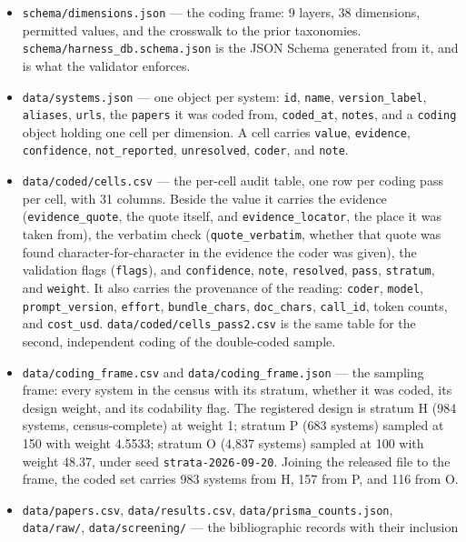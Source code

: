 \begin{itemize}
\item \texttt{schema/dimensions.json} --- the coding frame: 9 layers, 38 dimensions,
  permitted values, and the crosswalk to the prior taxonomies. \texttt{schema/harness\_db.schema.json}
  is the JSON Schema generated from it, and is what the validator enforces.
\item \texttt{data/systems.json} --- one object per system: \texttt{id}, \texttt{name},
  \texttt{version\_label}, \texttt{aliases}, \texttt{urls}, the \texttt{papers} it was coded from,
  \texttt{coded\_at}, \texttt{notes}, and a \texttt{coding} object holding one cell per dimension.
  A cell carries \texttt{value}, \texttt{evidence}, \texttt{confidence}, \texttt{not\_reported},
  \texttt{unresolved}, \texttt{coder}, and \texttt{note}.
\item \texttt{data/coded/cells.csv} --- the per-cell audit table, one row per coding pass per cell,
  with 31 columns. Beside the value it carries the evidence (\texttt{evidence\_quote}, the
  quote itself, and \texttt{evidence\_locator}, the place it was taken from), the verbatim check
  (\texttt{quote\_verbatim}, whether that quote was found character-for-character in the evidence
  the coder was given), the validation flags (\texttt{flags}), and \texttt{confidence},
  \texttt{note}, \texttt{resolved}, \texttt{pass}, \texttt{stratum}, and \texttt{weight}. It also
  carries the provenance of the reading: \texttt{coder}, \texttt{model},
  \texttt{prompt\_version}, \texttt{effort}, \texttt{bundle\_chars}, \texttt{doc\_chars},
  \texttt{call\_id}, token counts, and \texttt{cost\_usd}.
  \texttt{data/coded/cells\_pass2.csv} is the same table for the second, independent coding of the
  double-coded sample.
\item \texttt{data/coding\_frame.csv} and \texttt{data/coding\_frame.json} --- the sampling frame:
  every system in the census with its stratum, whether it was coded, its design weight, and its
  codability flag. The registered design is stratum H (984 systems, census-complete) at
  weight 1; stratum P (683 systems) sampled at 150 with weight 4.5533; stratum O
  (4,837 systems) sampled at 100 with weight 48.37, under seed
  \texttt{strata-2026-09-20}. Joining the released file to the frame, the coded set carries 983 systems
  from H, 157 from P, and 116 from O.
\item \texttt{data/papers.csv}, \texttt{data/results.csv}, \texttt{data/prisma\_counts.json},
  \texttt{data/raw/}, \texttt{data/screening/} --- the bibliographic records with their inclusion

\end{itemize}
